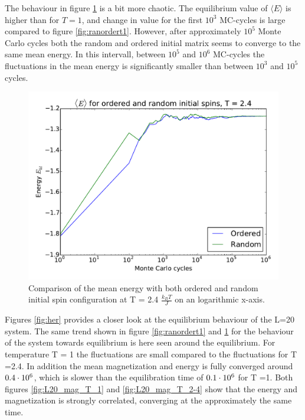 The behaviour in figure \ref{fig:ranordert2} is a bit more chaotic. The equilibrium value of $ \langle E \rangle  $ is higher than for $ T=1 $, and change in value for the first $ 10^{3} $ MC-cycles is large compared to figure \ref{fig:ranordert1}. However, after approximately  $ 10^{5} $ Monte Carlo cycles both the random and ordered initial matrix seems to converge to the same mean energy. In this intervall, between $ 10^{5} $ and $ 10^{6} $ MC-cycles the fluctuations in the mean energy is significantly smaller than between  $ 10^{3} $ and $ 10^{5} $ cycles. 


\begin{figure}[H]
		\centering
	\includegraphics[width=0.7\linewidth]{../results/4c/ran_order_T2}
	\caption{Comparison of the mean energy with both ordered and random initial spin configuration at T = 2.4 $\frac{k_BT}{J}  $ on an logarithmic x-axis.}
	\label{fig:ranordert2}
\end{figure}

Figures \ref{fig:her} provides a closer look at the equilibrium behaviour of the L=20 system. The same trend shown  in figure \ref{fig:ranordert1} and \ref{fig:ranordert2} for the behaviour of the system towards equilibrium is here seen around the equilibrium. For temperature T = 1 the fluctuations are small compared to the fluctuations for T =2.4. In addition the mean magnetization and energy is fully converged around $ 0.4\cdot 10^{6} $, which is slower than the equilibration time of  $ 0.1\cdot 10^{6} $ for T =1. Both figures  \ref{fig:L20_mag_T_1} and \ref{fig:L20_mag_T_2-4} show that the energy and magnetization is strongly correlated, converging at the approximately the same time.

